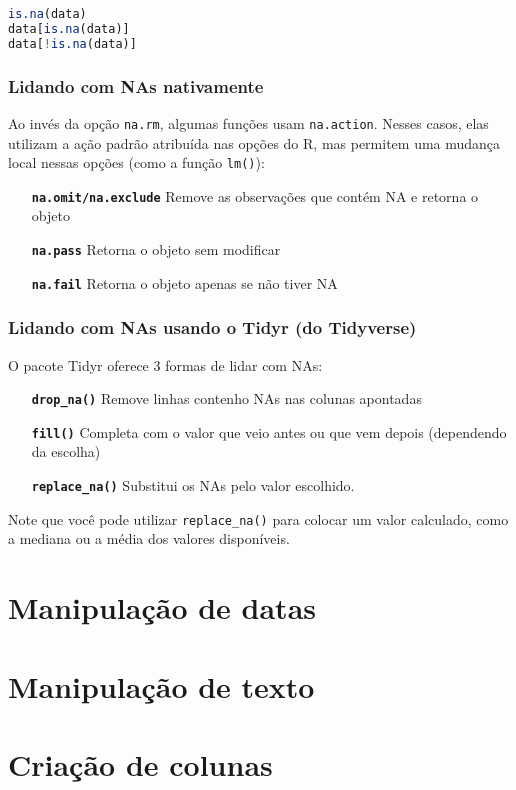 \documentclass{book}
\begin{document}
\lstset{style=ex1linha}
\begin{lstlisting}[language=R]
is.na(data)
data[is.na(data)]
data[!is.na(data)]
\end{lstlisting}

\subsubsection{Lidando com NAs nativamente}
Ao invés da opção \texttt{na.rm}, algumas funções usam \texttt{na.action}. Nesses casos, elas utilizam a ação padrão atribuída nas opções do R, mas permitem uma mudança local nessas opções (como a função \texttt{lm()}):

\begin{itemize}
  \item[\textbf{\texttt{na.omit/na.exclude}}] Remove as observações que contém NA e retorna o objeto
  \item[\textbf{\texttt{na.pass}}] Retorna o objeto sem modificar
  \item[\textbf{\texttt{na.fail}}] Retorna o objeto apenas se não tiver NA
\end{itemize}

\subsubsection{Lidando com NAs usando o Tidyr (do Tidyverse)}
O pacote Tidyr oferece 3 formas de lidar com NAs:

\begin{itemize}
  \item[\textbf{\texttt{drop\_na()}}] Remove linhas contenho NAs nas colunas apontadas
  \item[\textbf{\texttt{fill()}}] Completa com o valor que veio antes ou que vem depois (dependendo da escolha)
  \item[\textbf{\texttt{replace\_na()}}] Substitui os NAs pelo valor escolhido.
\end{itemize}

Note que você pode utilizar \texttt{replace\_na()} para colocar um valor calculado, como a mediana ou a média dos valores disponíveis.

\section{Manipulação de datas}
\section{Manipulação de texto}
\section{Criação de colunas}  %
\end{document}
